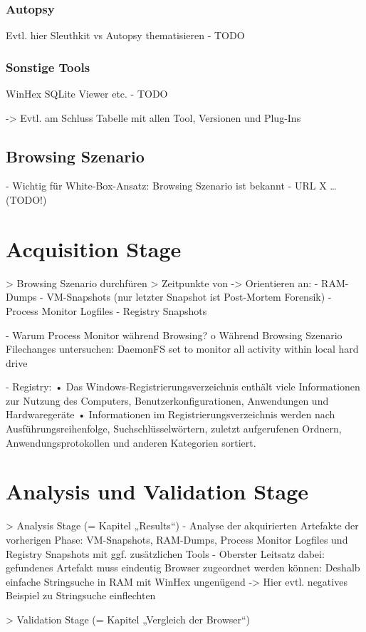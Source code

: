 \subsubsection*{Autopsy}
Evtl. hier Sleuthkit vs Autopsy thematisieren
	- TODO

\subsubsection*{Sonstige Tools}
WinHex SQLite Viewer etc.
	- TODO

-> Evtl. am Schluss Tabelle mit allen Tool, Versionen und Plug-Ins


\subsection{Browsing Szenario}
- Wichtig für White-Box-Ansatz: Browsing Szenario ist bekannt
- URL X … 	(TODO!)



\section{Acquisition Stage}

> Browsing Szenario durchfüren
> Zeitpunkte von -> Orientieren an: \cite{Muir.2019}
	- RAM-Dumps 
	- VM-Snapshots (nur letzter Snapshot ist Post-Mortem Forensik)
	- Process Monitor Logfiles
	- Registry Snapshots
	

- Warum Process Monitor während Browsing?
	o Während Browsing Szenario Filechanges untersuchen: DaemonFS set to monitor all activity within local hard drive\cite{Ohana.2013}
	
- Registry: \cite{Rochmadi.2017}
	•	Das Windows-Registrierungsverzeichnis enthält viele Informationen zur Nutzung des Computers, Benutzerkonfigurationen, Anwendungen und Hardwaregeräte
	•	Informationen im Registrierungsverzeichnis werden nach Ausführungsreihenfolge, Suchschlüsselwörtern, zuletzt aufgerufenen Ordnern, Anwendungsprotokollen und anderen Kategorien sortiert.
	
	

\section{Analysis und Validation Stage}

> Analysis Stage (= Kapitel „Results“)
	- Analyse der akquirierten Artefakte der vorherigen Phase: VM-Snapshots, RAM-Dumps, Process Monitor Logfiles und Registry Snapshots mit ggf. zusätzlichen Tools
	- Oberster Leitsatz dabei: gefundenes Artefakt muss eindeutig Browser zugeordnet werden können: Deshalb einfache Stringsuche in RAM mit WinHex ungenügend -> Hier evtl. negatives Beispiel zu Stringsuche einflechten

> Validation Stage (= Kapitel „Vergleich der Browser“)


